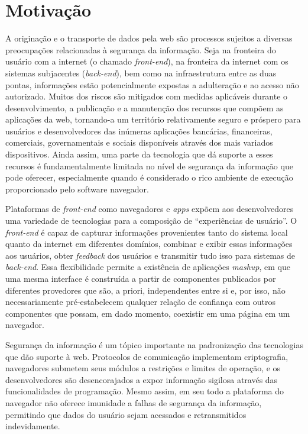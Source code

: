 \section{Motivação}
A originação e o transporte de dados pela web são processos sujeitos a diversas preocupações relacionadas à segurança da informação. Seja na fronteira do usuário com a internet (o chamado \textit{front-end}), na fronteira da internet com os sistemas subjacentes (\textit{back-end}), bem como na infraestrutura entre as duas pontas, informações estão potencialmente expostas a adulteração e ao acesso não autorizado. Muitos dos riscos são mitigados com medidas aplicáveis durante o desenvolvimento, a publicação e a manutenção dos recursos que compõem as aplicações da web, tornando-a um território relativamente seguro e próspero para usuários e desenvolvedores das inúmeras aplicações bancárias, financeiras, comerciais, governamentais e sociais disponíveis através dos mais variados dispositivos. Ainda assim, uma parte da tecnologia que dá suporte a esses recursos é fundamentalmente limitada no nível de segurança da informação que pode oferecer, especialmente quando é considerado o rico ambiente de execução proporcionado pelo software navegador.

Plataformas de \textit{front-end} como navegadores e \textit{apps} expõem aos desenvolvedores uma variedade de tecnologias para a composição de ``experiências de usuário''. O \textit{front-end} é capaz de capturar informações  provenientes tanto do sistema local quanto da internet em diferentes domínios, combinar e exibir essas informações aos usuários, obter \textit{feedback} dos usuários e transmitir tudo isso para sistemas de \textit{back-end}. Essa flexibilidade permite a existência de aplicações \textit{mashup}, em que uma mesma interface é construída a partir de componentes publicados por diferentes provedores que são, a priori, independentes entre si e, por isso, não necessariamente pré-estabelecem qualquer relação de confiança com outros componentes que possam, em dado momento, coexistir em uma página em um navegador.


Segurança da informação é um tópico importante na padronização das tecnologias que dão suporte à web. Protocolos de comunicação implementam criptografia, navegadores submetem seus módulos a restrições e limites de operação, e os desenvolvedores são desencorajados a expor informação sigilosa através das funcionalidades de programação. Mesmo assim, em seu todo a plataforma do navegador não oferece imunidade a falhas de segurança da informação, permitindo que dados do usuário sejam acessados e retransmitidos indevidamente.

